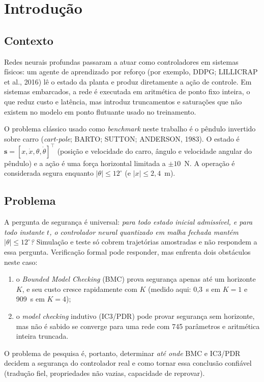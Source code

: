 \chapter{Introdução}

\section{Contexto}

Redes neurais profundas passaram a atuar como controladores em sistemas físicos: um agente de aprendizado por reforço (por exemplo, DDPG; LILLICRAP et al., 2016) lê o estado da planta e produz diretamente a ação de controle. Em sistemas embarcados, a rede é executada em aritmética de ponto fixo inteira, o que reduz custo e latência, mas introduz truncamentos e saturações que não existem no modelo em ponto flutuante usado no treinamento.

O problema clássico usado como \emph{benchmark} neste trabalho é o pêndulo invertido sobre carro (\emph{cart-pole}; BARTO; SUTTON; ANDERSON, 1983). O estado é $\mathbf{s}=[x,\dot x,\theta,\dot\theta]^\top$ (posição e velocidade do carro, ângulo e velocidade angular do pêndulo) e a ação é uma força horizontal limitada a $\pm10$~N. A operação é considerada segura enquanto $|\theta|\le12^\circ$ (e $|x|\le2{,}4$~m).

\section{Problema}

A pergunta de segurança é universal: \emph{para todo estado inicial admissível, e para todo instante $t$, o controlador neural quantizado em malha fechada mantém $|\theta|\le12^\circ$?} Simulação e teste só cobrem trajetórias amostradas e não respondem a essa pergunta. Verificação formal pode responder, mas enfrenta dois obstáculos neste caso:
\begin{enumerate}
  \item o \emph{Bounded Model Checking} (BMC) prova segurança apenas até um horizonte $K$, e seu custo cresce rapidamente com $K$ (medido aqui: 0,3~s em $K{=}1$ e 909~s em $K{=}4$);
  \item o \emph{model checking} indutivo (IC3/PDR) pode provar segurança sem horizonte, mas não é sabido se converge para uma rede com 745 parâmetros e aritmética inteira truncada.
\end{enumerate}
O problema de pesquisa é, portanto, determinar \emph{até onde} BMC e IC3/PDR decidem a segurança do controlador real e como tornar essa conclusão confiável (tradução fiel, propriedades não vazias, capacidade de reprovar).

